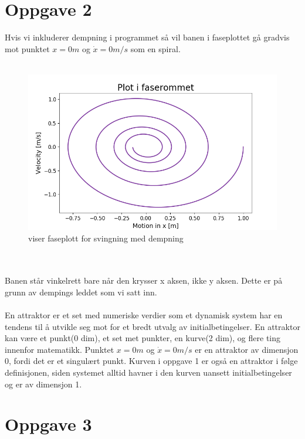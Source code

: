 \documentclass[norsk,a4paper,12pt]{article}
\begin{document}
\section*{Oppgave 2}
Hvis vi inkluderer dempning i programmet så vil banen i faseplottet gå gradvis mot punktet $x = 0m$ og $\dot{x} = 0 m/s$ som en spiral.
\\
\\
\begin{figure}[h]
\begin{center}
\includegraphics[scale=0.5]{Oppgave2fase.png}
\caption{viser faseplott for svingning med dempning}
\label{fig:faseplot2}
\end{center}
\end{figure}
\\
\\
Banen står vinkelrett bare når den krysser x aksen, ikke y aksen. Dette er på grunn av dempings leddet som vi satt inn. 
\\
\\
En attraktor er et set med numeriske verdier som et dynamisk system har en tendens til å utvikle seg mot for et bredt utvalg av initialbetingelser. En attraktor kan være et punkt(0 dim), et set met punkter, en kurve(2 dim), og flere ting innenfor matematikk. Punktet $x=0m$ og $\dot{x}=0m/s$ er en attraktor av dimensjon 0, fordi det er et singulært punkt. Kurven i oppgave 1 er også en attraktor i følge definisjonen, siden systemet alltid havner i den kurven uansett initialbetingelser og er av dimensjon 1. 





\section*{Oppgave 3}
\end{document}
